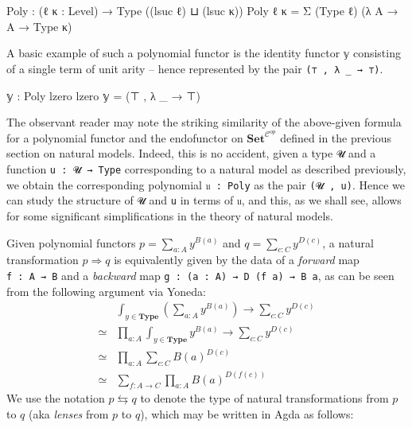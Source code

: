 \documentclass[
  11pt,
  oneside,
  article]{memoir}
\newenvironment{Shaded}{}{}
\newcommand{\NormalTok}[1]{#1}
\newcommand{\OtherTok}[1]{\textcolor[rgb]{0.00,0.44,0.13}{#1}}
\theoremstyle{definition}
\theoremstyle{plain}
\newcommand{\0}{\textsf{0}}
\newcommand{\1}{\tn{\textsf{1}}}
\begin{document}
\begin{Shaded}
\begin{Highlighting}[]
\NormalTok{Poly }\OtherTok{:} \OtherTok{(}\NormalTok{ℓ κ }\OtherTok{:}\NormalTok{ Level}\OtherTok{)} \OtherTok{→}\NormalTok{ Type }\OtherTok{((}\NormalTok{lsuc ℓ}\OtherTok{)}\NormalTok{ ⊔ }\OtherTok{(}\NormalTok{lsuc κ}\OtherTok{))}
\NormalTok{Poly ℓ κ }\OtherTok{=}\NormalTok{ Σ }\OtherTok{(}\NormalTok{Type ℓ}\OtherTok{)} \OtherTok{(λ}\NormalTok{ A }\OtherTok{→}\NormalTok{ A }\OtherTok{→}\NormalTok{ Type κ}\OtherTok{)}
\end{Highlighting}
\end{Shaded}

A basic example of such a polynomial functor is the identity functor
\texttt{𝕪} consisting of a single term of unit arity -- hence
represented by the pair \texttt{(⊤\ ,\ λ\ \_\ →\ ⊤)}.

\begin{Shaded}
\begin{Highlighting}[]
\NormalTok{𝕪 }\OtherTok{:}\NormalTok{ Poly lzero lzero}
\NormalTok{𝕪 }\OtherTok{=} \OtherTok{(}\NormalTok{⊤ , }\OtherTok{λ} \OtherTok{\_} \OtherTok{→}\NormalTok{ ⊤}\OtherTok{)}
\end{Highlighting}
\end{Shaded}

The observant reader may note the striking similarity of the above-given
formula for a polynomial functor and the endofunctor on
\(\mathbf{Set}^{\mathcal{C}^{op}}\) defined in the previous section on
natural models. Indeed, this is no accident, given a type \texttt{𝓤} and
a function \texttt{u\ :\ 𝓤\ →\ Type} corresponding to a natural model as
described previously, we obtain the corresponding polynomial
\texttt{𝔲\ :\ Poly} as the pair \texttt{(𝓤\ ,\ u)}. Hence we can study
the structure of \texttt{𝓤} and \texttt{u} in terms of \texttt{𝔲}, and
this, as we shall see, allows for some significant simplifications in
the theory of natural models.

Given polynomial functors \(p = \sum_{a : A} y^{B(a)}\) and
\(q = \sum_{c : C} y^{D(c)}\), a natural transformation
\(p \Rightarrow q\) is equivalently given by the data of a
\emph{forward} map \texttt{f\ :\ A\ →\ B} and a \emph{backward} map
\texttt{g\ :\ (a\ :\ A)\ →\ D\ (f\ a)\ →\ B\ a}, as can be seen from the
following argument via Yoneda: \[
\begin{array}{rl}
& \int_{y \in \mathbf{Type}} \left( \sum_{a : A} y^{B(a)}  \right) \to \sum_{c : C} y^{D(c)}\\
\simeq & \prod_{a : A} \int_{y \in \mathbf{Type}} y^{B(a)} \to \sum_{c : C} y^{D(c)}\\
\simeq & \prod_{a : A} \sum_{c : C} B(a)^{D(c)}\\
\simeq & \sum_{f : A \to C} \prod_{a : A} B(a)^{D(f(c))}
\end{array}
\] We use the notation \(p \leftrightarrows q\) to denote the type of
natural transformations from \(p\) to \(q\) (aka \emph{lenses} from
\(p\) to \(q\)), which may be written in Agda as follows:
\end{document}

